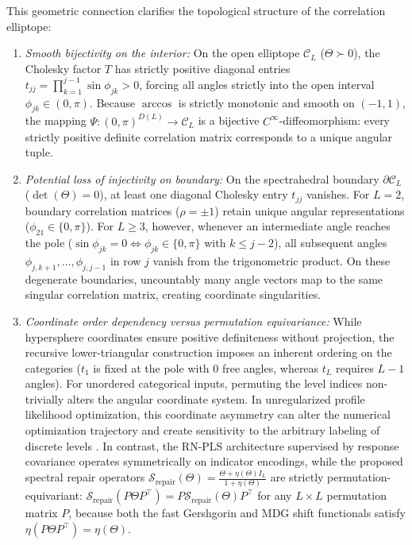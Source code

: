 \documentclass[default,sn-mathphys,Numbered]{sn-jnl}
\theoremstyle{thmstyleone}
\theoremstyle{thmstylethree}
\theoremstyle{thmstyletwo}
\begin{document}
This geometric connection clarifies the topological structure of the correlation elliptope:
\begin{enumerate}
    \item[(i)] \textit{Smooth bijectivity on the interior:} On the open elliptope $\mathcal{C}_L$ ($\Theta \succ 0$), the Cholesky factor $T$ has strictly positive diagonal entries $t_{jj} = \prod_{k=1}^{j-1} \sin \phi_{jk} > 0$, forcing all angles strictly into the open interval $\phi_{jk} \in (0, \pi)$. Because $\arccos$ is strictly monotonic and smooth on $(-1, 1)$, the mapping $\Psi : (0, \pi)^{D(L)} \to \mathcal{C}_L$ is a bijective $C^\infty$-diffeomorphism: every strictly positive definite correlation matrix corresponds to a unique angular tuple.
    \item[(ii)] \textit{Potential loss of injectivity on boundary:} On the spectrahedral boundary $\partial\mathcal{C}_L$ ($\det(\Theta) = 0$), at least one diagonal Cholesky entry $t_{jj}$ vanishes. For $L=2$, boundary correlation matrices ($\rho = \pm 1$) retain unique angular representations ($\phi_{21} \in \{0, \pi\}$). For $L \ge 3$, however, whenever an intermediate angle reaches the pole ($\sin\phi_{jk} = 0 \iff \phi_{jk} \in \{0, \pi\}$ with $k \le j - 2$), all subsequent angles $\phi_{j,k+1}, \ldots, \phi_{j,j-1}$ in row $j$ vanish from the trigonometric product. On these degenerate boundaries, uncountably many angle vectors map to the same singular correlation matrix, creating coordinate singularities.
    \item[(iii)] \textit{Coordinate order dependency versus permutation equivariance:} While hypersphere coordinates ensure positive definiteness without projection, the recursive lower-triangular construction imposes an inherent ordering on the categories ($t_1$ is fixed at the pole with $0$ free angles, whereas $t_L$ requires $L-1$ angles). For unordered categorical inputs, permuting the level indices non-trivially alters the angular coordinate system. In unregularized profile likelihood optimization, this coordinate asymmetry can alter the numerical optimization trajectory and create sensitivity to the arbitrary labeling of discrete levels \citep{li2022permutation}. In contrast, the RN-PLS architecture supervised by response covariance operates symmetrically on indicator encodings, while the proposed spectral repair operators $\mathcal{S}_{\mathrm{repair}}(\Theta) = \frac{\Theta + \eta(\Theta)I_L}{1 + \eta(\Theta)}$ are strictly permutation-equivariant: $\mathcal{S}_{\mathrm{repair}}(P \Theta P^\top) = P \mathcal{S}_{\mathrm{repair}}(\Theta) P^\top$ for any $L \times L$ permutation matrix $P$, because both the fast Gershgorin and MDG shift functionals satisfy $\eta(P \Theta P^\top) = \eta(\Theta)$.
\end{enumerate}
\end{document}
